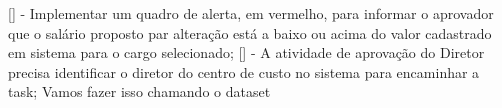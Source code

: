 [] - Implementar um quadro de alerta, em vermelho, para informar o aprovador que o salário proposto par alteração está a baixo ou  acima do valor cadastrado em sistema para o cargo selecionado;
[] - A atividade de aprovação do Diretor precisa identificar o diretor do centro de custo no sistema para encaminhar a task; Vamos fazer isso chamando o dataset 